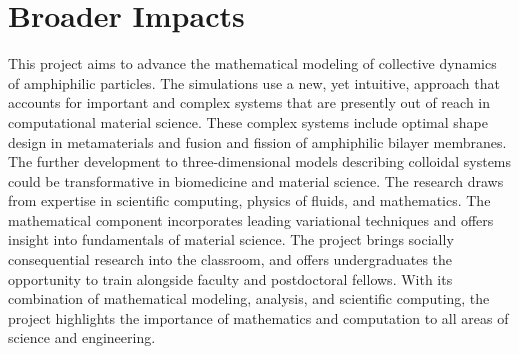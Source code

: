 \section{Broader Impacts}
\label{sec:BroaderImpacts}
This project aims to advance the mathematical modeling of collective
dynamics of amphiphilic particles. The simulations use a new, yet
intuitive, approach that accounts for important and complex systems
that are presently out of reach in computational material science. These complex
systems include optimal shape design in metamaterials and
fusion and fission of amphiphilic bilayer membranes. The further
development to three-dimensional models describing colloidal systems could be
transformative in biomedicine and material science. The research draws
from expertise in scientific computing, physics of fluids, and
mathematics. The mathematical component incorporates leading
variational techniques and offers insight into fundamentals of material
science. The project brings socially consequential research into the
classroom, and offers undergraduates the opportunity to train alongside
faculty and postdoctoral fellows. With its combination of
mathematical modeling, analysis, and scientific computing, the project
highlights the importance of mathematics and computation to all areas of
science and engineering.

